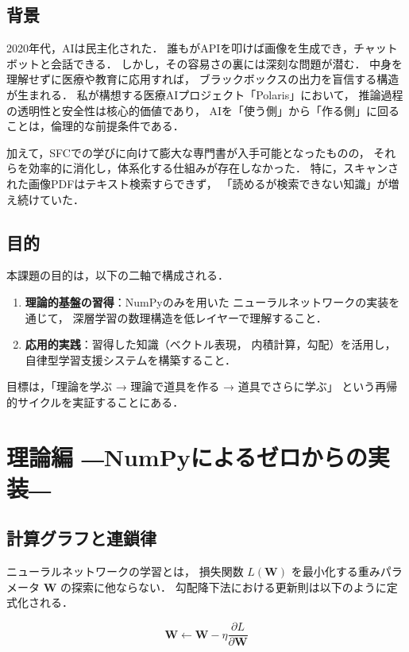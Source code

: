 \documentclass[uplatex, dvipdfmx, a4paper, 11pt]{jsarticle}
\begin{document}
\subsection{背景}
2020年代，AIは民主化された．
誰もがAPIを叩けば画像を生成でき，チャットボットと会話できる．
しかし，その容易さの裏には深刻な問題が潜む．
中身を理解せずに医療や教育に応用すれば，
ブラックボックスの出力を盲信する構造が生まれる．
私が構想する医療AIプロジェクト「Polaris」において，
推論過程の透明性と安全性は核心的価値であり，
AIを「使う側」から「作る側」に回ることは，倫理的な前提条件である．

加えて，SFCでの学びに向けて膨大な専門書が入手可能となったものの，
それらを効率的に消化し，体系化する仕組みが存在しなかった．
特に，スキャンされた画像PDFはテキスト検索すらできず，
「読めるが検索できない知識」が増え続けていた．

\subsection{目的}
本課題の目的は，以下の二軸で構成される．

\begin{enumerate}
    \item \textbf{理論的基盤の習得}：NumPyのみを用いた
          ニューラルネットワークの実装を通じて，
          深層学習の数理構造を低レイヤーで理解すること．
    \item \textbf{応用的実践}：習得した知識（ベクトル表現，
          内積計算，勾配）を活用し，自律型学習支援システムを構築すること．
\end{enumerate}

目標は，「理論を学ぶ → 理論で道具を作る → 道具でさらに学ぶ」
という再帰的サイクルを実証することにある．


\section{理論編 ―NumPyによるゼロからの実装―}

\subsection{計算グラフと連鎖律}
ニューラルネットワークの学習とは，
損失関数 $L(\bm{W})$ を最小化する重みパラメータ $\bm{W}$ の探索に他ならない．
勾配降下法における更新則は以下のように定式化される．

\begin{equation}
    \bm{W} \leftarrow \bm{W} - \eta \frac{\partial L}{\partial \bm{W}}
    \label{eq:gradient_descent}
\end{equation}
\end{document}
